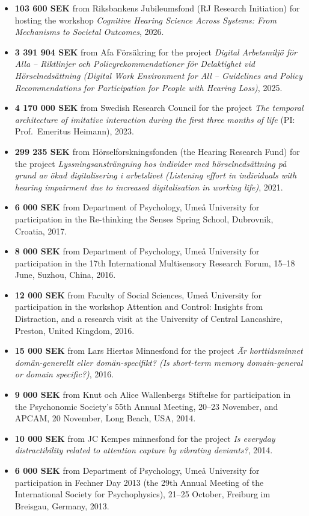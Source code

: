\documentclass[]{article}
\begin{document}
\begin{itemize}
\item
  \textbf{103 600 SEK} from Riksbankens Jubileumsfond (RJ Research
  Initiation) for hosting the workshop \emph{Cognitive Hearing Science
  Across Systems: From Mechanisms to Societal Outcomes}, 2026.
\item
  \textbf{3 391 904 SEK} from Afa Försäkring for the project
  \emph{Digital Arbetsmiljö för Alla -- Riktlinjer och
  Policyrekommendationer för Delaktighet vid Hörselnedsättning (Digital
  Work Environment for All -- Guidelines and Policy Recommendations for
  Participation for People with Hearing Loss)}, 2025.
\item
  \textbf{4 170 000 SEK} from Swedish Research Council for the project
  \emph{The temporal architecture of imitative interaction during the
  first three months of life} (PI: Prof.~Emeritus Heimann), 2023.
\item
  \textbf{299 235 SEK} from Hörselforskningsfonden (the Hearing Research
  Fund) for the project \emph{Lyssningsansträngning hos individer med
  hörselnedsättning på grund av ökad digitalisering i arbetslivet
  (Listening effort in individuals with hearing impairment due to
  increased digitalisation in working life)}, 2021.
\item
  \textbf{6 000 SEK} from Department of Psychology, Umeå University for
  participation in the Re-thinking the Senses Spring School, Dubrovnik,
  Croatia, 2017.
\item
  \textbf{8 000 SEK} from Department of Psychology, Umeå University for
  participation in the 17th International Multisensory Research Forum,
  15--18 June, Suzhou, China, 2016.
\item
  \textbf{12 000 SEK} from Faculty of Social Sciences, Umeå University
  for participation in the workshop Attention and Control: Insights from
  Distraction, and a research visit at the University of Central
  Lancashire, Preston, United Kingdom, 2016.
\item
  \textbf{15 000 SEK} from Lars Hiertas Minnesfond for the project
  \emph{Är korttidsminnet domän-generellt eller domän-specifikt? (Is
  short-term memory domain-general or domain specific?)}, 2016.
\item
  \textbf{9 000 SEK} from Knut och Alice Wallenbergs Stiftelse for
  participation in the Psychonomic Society's 55th Annual Meeting, 20--23
  November, and APCAM, 20 November, Long Beach, USA, 2014.
\item
  \textbf{10 000 SEK} from JC Kempes minnesfond for the project \emph{Is
  everyday distractibility related to attention capture by vibrating
  deviants?}, 2014.
\item
  \textbf{6 000 SEK} from Department of Psychology, Umeå University for
  participation in Fechner Day 2013 (the 29th Annual Meeting of the
  International Society for Psychophysics), 21--25 October, Freiburg im
  Breisgau, Germany, 2013.
\end{itemize}
\end{document}
